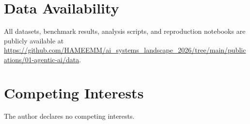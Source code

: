 \documentclass[12pt, a4paper]{article}
\begin{document}
\section*{Data Availability}
All datasets, benchmark results, analysis scripts, and reproduction notebooks are publicly available at \url{https://github.com/HAMEEMM/ai_systems_landscape_2026/tree/main/publications/01-agentic-ai/data}.

\section*{Competing Interests}
The author declares no competing interests.


\end{document}
